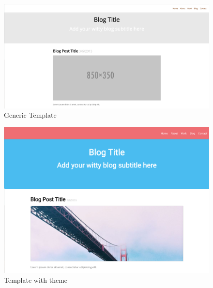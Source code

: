 \begin{figure}[h]
\centering
\includegraphics[scale=0.13]{images/placeholderTemp}
\caption{Generic Template}
  \label{fig:gentemp}
\end{figure}


\begin{figure}[ht]
\centering
\includegraphics[scale=0.2]{images/withtheme}
\caption{Template with theme}
  \label{fig:temtheme}
\end{figure}

